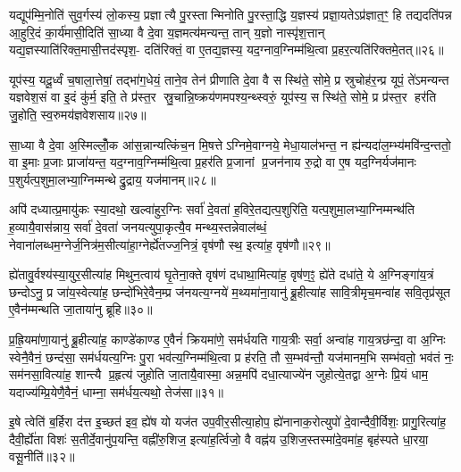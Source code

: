 यद्यूप॑म्मि॒नोति॑ सुव॒र्गस्य॑ लो॒कस्य॒ प्रज्ञात्यै पु॒रस्तान्मिनोति पु॒रस्ता॒द्धि य॒ज्ञस्य॑ प्रज्ञा॒यतेऽप्र॑ज्ञात॒ꣳ॒ हि तद्यदति॑पन्न आ॒हुरि॒दं का॒र्य॑मासी॒दिति॑ सा॒ध्या वै दे॒वा य॒ज्ञमत्य॑मन्यन्त॒ तान् य॒ज्ञो नास्पृ॑श॒त्तान् यद्य॒ज्ञस्याति॑रिक्त॒मासी॒त्तद॑स्पृश॒- दति॑रिक्तं॒ वा ए॒तद्य॒ज्ञस्य॒ यद॒ग्नाव॒ग्निम्म॑थि॒त्वा प्र॒हर॒त्यति॑रिक्तमे॒तत्॥२६॥

यूप॑स्य॒ यदू॒र्ध्वं च॒षाला॒त्तेषां॒ तद्भा॑ग॒धेयं॒ ताने॒व तेन॑ प्रीणाति दे॒वा वै सस्थि॑ते॒ सोमे॒ प्र स्रुचोह॑र॒न्प्र यूपं॒ ते॑ऽमन्यन्त यज्ञवेश॒सं वा इ॒दं कु॑र्म॒ इति॒ ते प्र॑स्त॒र स्रु॒चान्नि॒ष्क्रय॑णमपश्य॒न्थ्स्वरुं॒ यूप॑स्य॒ सस्थि॑ते॒ सोमे॒ प्र प्र॑स्त॒र हर॑ति जु॒होति॒ स्व॒रुमय॑ज्ञवेशसाय॥२७॥

{\anuvakamend[{द॒धा॒ति॒ प्रत्यृ॒चा सम॑र्धयेय॒मित्यू॒र्जैनं॒ विश्वे॑षां यूप॒त्वमति॑रिक्तमे॒तद्द्विच॑त्वारिशच्च॥४॥}]}

सा॒ध्या वै दे॒वा अ॒स्मिल्लोँ॒क आ॑स॒न्नान्यत्किंच॒न मि॒षत्तेऽग्निमे॒वाग्नये॒ मेधा॒याल॑भन्त॒ न ह्य॑न्यदा॑ल॒म्भ्य॑मवि॑न्द॒न्ततो॒ वा इ॒माः प्र॒जाः प्राजा॑यन्त॒ यद॒ग्नाव॒ग्निम्म॑थि॒त्वा प्र॒हर॑ति प्र॒जानां प्र॒जन॑नाय रु॒द्रो वा ए॒ष यद॒ग्निर्यज॑मानः प॒शुर्यत्प॒शुमा॒लभ्या॒ग्निम्मन्थेद्रु॒द्राय॒ यज॑मानम्॥२८॥

अपि॑ दध्यात्प्र॒मायु॑कः स्या॒दथो॒ खल्वा॑हुर॒ग्निः सर्वा॑ दे॒वता॑ ह॒विरे॒तद्यत्प॒शुरिति॒ यत्प॒शुमा॒लभ्या॒ग्निम्मन्थ॑ति ह॒व्यायै॒वास॑न्नाय॒ सर्वा॑ दे॒वता॑ जनयत्युपा॒कृत्यै॒व मन्थ्य॒स्तन्नेवाल॑ब्धं॒ नेवाना॑लब्धम॒ग्नेर्ज॒नित्र॑म॒सीत्या॑हा॒ग्नेर्\mbox{}ह्ये॑तज्ज॒नित्रं॒ वृष॑णौ स्थ॒ इत्या॑ह॒ वृष॑णौ॥२९॥

ह्ये॑तावु॒र्वश्य॑स्या॒युर॒सीत्या॑ह मिथुन॒त्वाय॑ घृ॒तेना॒क्ते वृष॑णं दधाथा॒मित्या॑ह॒ वृष॑ण॒ꣵ॒ ह्ये॑ते दधा॑ते॒ ये अ॒ग्निङ्गा॑य॒त्रं छन्दोऽनु॒ प्र जा॑य॒स्वेत्या॑ह॒ छन्दो॑भिरे॒वैन॒म्प्र ज॑नयत्य॒ग्नये॑ म॒थ्यमा॑ना॒यानु॑ ब्रू॒हीत्या॑ह सावि॒त्रीमृच॒मन्वा॑ह सवि॒तृप्र॑सूत ए॒वैन॑म्मन्थति जा॒ताया॑नु ब्रूहि॥३०॥

प्र॒ह्रि॒यमा॑णा॒यानु॑ ब्रू॒हीत्या॑ह॒ काण्डे॑काण्ड ए॒वैनं॑ क्रियमा॑णे॒ सम॑र्धयति गाय॒त्रीः सर्वा॒ अन्वा॑ह गाय॒त्रछ॑न्दा॒ वा अ॒ग्निः स्वेनै॒वैनं॒ छन्द॑सा॒ सम॑र्धयत्य॒ग्निः पु॒रा भव॑त्य॒ग्निम्म॑थि॒त्वा प्र ह॑रति॒ तौ स॒म्भव॑न्तौ॒ यज॑मानम॒भि सम्भ॑वतो॒ भव॑तं नः॒ सम॑नसा॒वित्या॑ह॒ शान्त्यै प्र॒हृत्य॑ जुहोति जा॒तायै॒वास्मा॒ अन्न॒मपि॑ दधा॒त्याज्ये॑न जुहोत्ये॒तद्वा अ॒ग्नेः प्रि॒यं धाम॒ यदाज्य॑म्प्रि॒येणै॒वैनं॒ धाम्ना॒ सम॑र्धय॒त्यथो॒ तेज॑सा॥३१॥

{\anuvakamend[{यज॑मानमाह॒ वृष॑णौ जाता॒यानु॑ब्रू॒ह्यप्य॒ष्टाद॑श च॥५॥}]}

इ॒षे त्वेति॑ ब॒र्\mbox{}हिरा द॑त्त इ॒च्छत॑ इव॒ ह्ये॑ष यो यज॑त उप॒वीर॒सीत्या॒होप॒ ह्ये॑नानाक॒रोत्युपो॑ दे॒वान्दैवी॒र्विशः॒ प्रागु॒रित्या॑ह॒ दैवी॒र्\mbox{}ह्ये॑ता विशः॑ स॒तीर्दे॒वानु॑प॒यन्ति॒ वह्नी॑रु॒शिज॒ इत्या॑ह॒र्त्विजो॒ वै वह्न॑य उ॒शिज॒स्तस्मा॑दे॒वमा॑ह॒ बृह॑स्पते धा॒रया॒ वसू॒नीति॑॥३२॥

